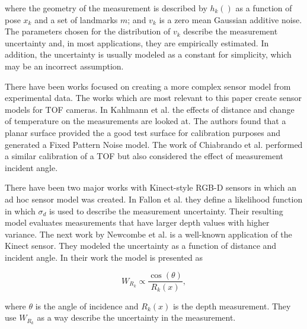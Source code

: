 \noindent where the geometry of the measurement is described by $h_k()$ as a 
function of pose $x_k$ and a set of landmarks $m$; and $v_k$ is a zero
mean Gaussian additive noise. The parameters chosen for
the distribution of $v_k$ describe the measurement uncertainty and, in most
applications, they are empirically estimated. In addition, the uncertainty is
usually modeled as a constant for simplicity, which may be an incorrect
assumption. 

There have been works focused on creating a more complex sensor model from experimental
data. The works which are most relevant to this paper create sensor models for
\ac{TOF} cameras. In Kahlmann et al. \cite{Kahlmann2006} the effects of
distance and change of temperature on the measurements are looked at. The authors
found that a planar surface provided the a good test surface for calibration
purposes and generated a Fixed Pattern Noise model. The work of Chiabrando et
al. \cite{Chiabrando2009} performed a similar calibration of a \ac{TOF} but
also considered the effect of measurement incident angle. 

There have been two major works with Kinect-style \mbox{RGB-D} sensors in which an ad hoc sensor model was created. In Fallon et al. \cite{Fallon2012} they define a likelihood function in which $\sigma_d$ is used to describe the measurement uncertainty. Their resulting model evaluates measurements that have larger depth values with higher variance. The next work by Newcombe et al. \cite{Newcombe2011} is a well-known application of the Kinect sensor. They modeled the uncertainty as a function of distance and incident angle. In their work the model is presented as 

%
%

%
{
\begin{equation*}
W_{R_k} \propto \frac{ \cos(\theta) }{R_k(x)},
\end{equation*}
}
%

\noindent where $\theta$ is the angle of incidence and $R_k(x)$ is the depth measurement. They use $W_{R_k}$ as a way describe the uncertainty in the measurement. 

